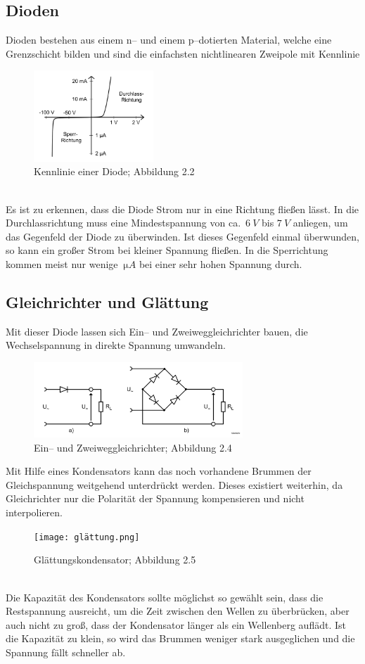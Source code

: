 \documentclass[a4paper,10pt]{article}
\numberwithin{equation}{section}
\begin{document}
\subsection{Dioden}
Dioden bestehen aus einem n-- und einem p--dotierten Material, welche eine Grenzschicht bilden und sind die einfachsten nichtlinearen Zweipole mit Kennlinie
\begin{figure}[h]
	\centering
	\includegraphics[width=0.4\textwidth]{diode_kennlinie.png}
	\caption{Kennlinie einer Diode; Abbildung 2.2 \cite{Praktikumsanleitung}}
\end{figure}\\
Es ist zu erkennen, dass die Diode Strom nur in eine Richtung fließen lässt.
In die Durchlassrichtung muss eine Mindestspannung von ca.\ $\SI{6}{V}$ bis $\SI{7}{V}$ anliegen, um das Gegenfeld der Diode zu überwinden.
Ist dieses Gegenfeld einmal überwunden, so kann ein großer Strom bei kleiner Spannung fließen.
In die Sperrichtung kommen meist nur wenige $\SI{}{\micro A}$ bei einer sehr hohen Spannung durch.

\subsection{Gleichrichter und Glättung}
Mit dieser Diode lassen sich Ein-- und Zweiweggleichrichter bauen, die Wechselspannung in direkte Spannung umwandeln.
\begin{figure}[h]
	\centering
	\includegraphics[width=0.7\textwidth]{ein_zweiweggleichrichter.png}
	\caption{Ein-- und Zweiweggleichrichter; Abbildung 2.4 \cite{Praktikumsanleitung}}
\end{figure}
Mit Hilfe eines Kondensators kann das noch vorhandene Brummen der Gleichspannung weitgehend unterdrückt werden.
Dieses existiert weiterhin, da Gleichrichter nur die Polarität der Spannung kompensieren und nicht interpolieren.
\begin{figure}[h]
	\centering
	\texttt{[image: glättung.png]}
	\caption{Glättungskondensator; Abbildung 2.5 \cite{Praktikumsanleitung}}
\end{figure}\\
Die Kapazität des Kondensators sollte möglichst so gewählt sein, dass die Restspannung ausreicht, um die Zeit zwischen den Wellen zu überbrücken, aber auch nicht zu groß, dass der Kondensator länger als ein Wellenberg auflädt.
Ist die Kapazität zu klein, so wird das Brummen weniger stark ausgeglichen und die Spannung fällt schneller ab.
\end{document}
